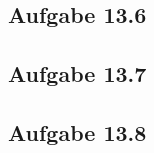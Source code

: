 \documentclass{standalone}
\begin{document}
\subsection{Aufgabe 13.6}


\subsection{Aufgabe 13.7}


\subsection{Aufgabe 13.8}
\end{document}
